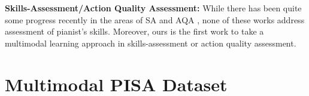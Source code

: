 \documentclass{article}
\begin{document}
\noindent\textbf{Skills-Assessment/Action Quality Assessment:} While there has been quite some progress recently in the areas of SA \cite{doughty2018s, li2018evaluation, doughty2019pros, li2019manipulation, seo2019understanding, li2019automated, wang2020towards, chen2020toward} and AQA \cite{gordon1995automated, pirsiavash2014assessing, parmar2016measuring, parmar2017learning, li2018end, xiang2018s3d, li2018scoringnet, xu2019learning, parmar2019action, lei2020learning, parmar2019hallucinet, sardari2019view, pan2019action, mtlaqa, jain2019unsupervised, ogata2019temporal, gao2020asymmetric, wang2020hands, wang2020assessing, zeng2020hybrid, nekoui2020falcons, tang2020uncertainty, du2020multi, jain2020action, sardari2020vi, condorivirtual, parsa2020multi}, none of these works address assessment of pianist's skills. Moreover, ours is the first work to take a multimodal learning approach in skills-assessment or action quality assessment. \section{Multimodal PISA Dataset}
\label{sec:dataset}
\end{document}
